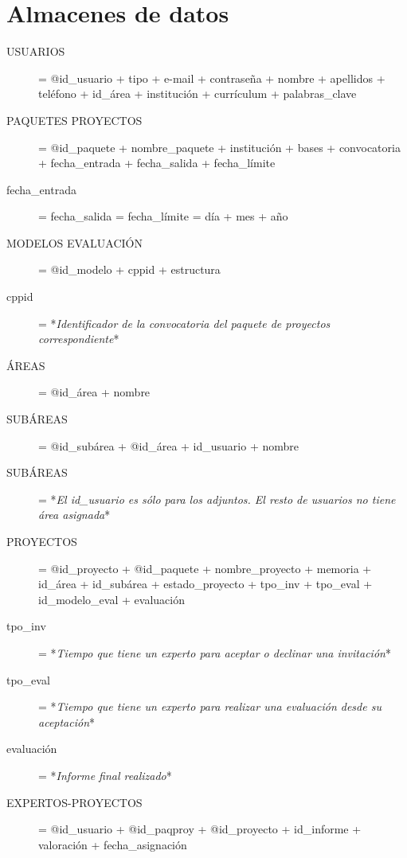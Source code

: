 \documentclass[12pt,a4paper,spanish,twoside]{book}
\begin{document}
\section{Almacenes de datos}
\begin{description}
\item[USUARIOS] = @id\_usuario + tipo + e-mail + contraseña + nombre +
  apellidos + teléfono + id\_área + institución + currículum +
  palabras\_clave 

\item[PAQUETES PROYECTOS] = @id\_paquete + nombre\_paquete + institución +
  bases + convocatoria + fecha\_entrada + fecha\_salida + fecha\_límite 

\item[fecha\_entrada] = fecha\_salida = fecha\_límite = día + mes + año

\item[MODELOS EVALUACIÓN] = @id\_modelo + cppid + estructura

\item[cppid] = *\emph{Identificador de la convocatoria del paquete de
    proyectos correspondiente}* 

\item[ÁREAS] = @id\_área + nombre

\item[SUBÁREAS] = @id\_subárea + @id\_área + id\_usuario + nombre

\item[SUBÁREAS] = *\emph{El id\_usuario es sólo para los adjuntos. El resto
    de usuarios no tiene área asignada}* 

\item[PROYECTOS] = @id\_proyecto + @id\_paquete + nombre\_proyecto + memoria
  + id\_área + id\_subárea + estado\_proyecto + tpo\_inv + tpo\_eval +
  id\_modelo\_eval + evaluación 

\item[tpo\_inv] = *\emph{Tiempo que tiene un experto para aceptar o declinar
    una invitación}* 

\item[tpo\_eval] = *\emph{Tiempo que tiene un experto para realizar una
    evaluación desde su aceptación}* 

\item[evaluación] = *\emph{Informe final realizado}*

\item[EXPERTOS-PROYECTOS] = @id\_usuario + @id\_paqproy + @id\_proyecto +
  id\_informe + valoración + fecha\_asignación 


\end{description}
\end{document}
